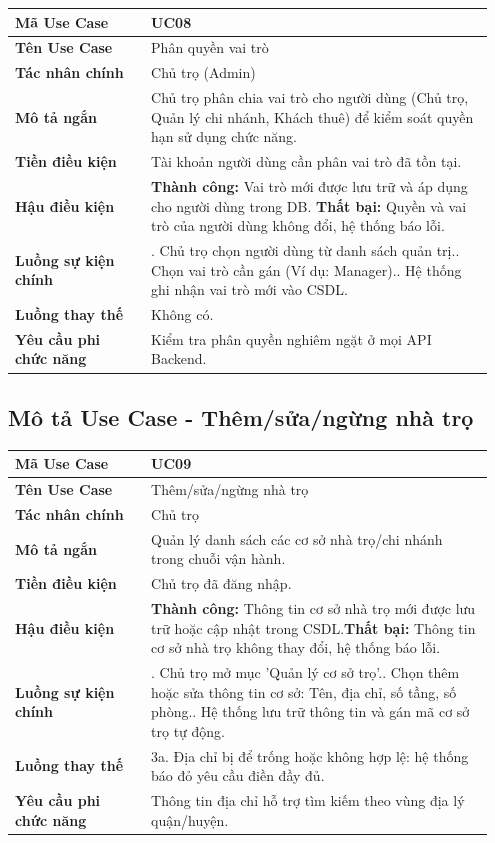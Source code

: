 \documentclass[a4paper,oneside]{report}
\begin{document}
\begin{longtable}[]{@{}>{\RaggedRight\arraybackslash}p{0.27\linewidth}>{\RaggedRight\arraybackslash}p{0.68\linewidth}@{}}
\toprule
\textbf{Mã Use Case} & UC08\tabularnewline
\midrule
\endhead
\textbf{Tên Use Case} & Phân quyền vai trò\tabularnewline
\textbf{Tác nhân chính} & Chủ trọ (Admin)\tabularnewline
\textbf{Mô tả ngắn} & Chủ trọ phân chia vai trò cho người dùng (Chủ trọ,
Quản lý chi nhánh, Khách thuê) để kiểm soát quyền hạn sử dụng chức
năng.\tabularnewline
\textbf{Tiền điều kiện} & Tài khoản người dùng cần phân vai trò đã tồn
tại.\tabularnewline
\textbf{Hậu điều kiện} & \textbf{Thành công:} Vai trò mới được lưu trữ và áp dụng cho người dùng trong DB.\newline
\textbf{Thất bại:} Quyền và vai trò của người dùng không đổi, hệ thống báo lỗi.\tabularnewline
\textbf{Luồng sự kiện chính} & 1. Chủ trọ chọn người
dùng từ danh sách quản trị.\newline 2. Chọn vai trò cần gán (Ví dụ:
Manager).\newline 3. Hệ thống ghi nhận vai trò mới vào
CSDL.\tabularnewline
\textbf{Luồng thay thế} & Không có.\tabularnewline
\textbf{Yêu cầu phi chức năng} & Kiểm tra phân quyền nghiêm ngặt ở mọi
API Backend.\tabularnewline
\bottomrule
\end{longtable}

\subsection{Mô tả Use Case - Thêm/sửa/ngừng nhà trọ}

\begin{longtable}[]{@{}>{\RaggedRight\arraybackslash}p{0.27\linewidth}>{\RaggedRight\arraybackslash}p{0.68\linewidth}@{}}
\toprule
\textbf{Mã Use Case} & UC09\tabularnewline
\midrule
\endhead
\textbf{Tên Use Case} & Thêm/sửa/ngừng nhà trọ\tabularnewline
\textbf{Tác nhân chính} & Chủ trọ\tabularnewline
\textbf{Mô tả ngắn} & Quản lý danh sách các cơ sở nhà trọ/chi nhánh
trong chuỗi vận hành.\tabularnewline
\textbf{Tiền điều kiện} & Chủ trọ đã đăng nhập.\tabularnewline
\textbf{Hậu điều kiện} & \textbf{Thành công:} Thông tin cơ sở nhà trọ mới được lưu trữ hoặc cập nhật trong CSDL.\newline \textbf{Thất bại:} Thông tin cơ sở nhà trọ không thay đổi, hệ thống báo lỗi.\tabularnewline
\textbf{Luồng sự kiện chính} & 1. Chủ trọ mở mục
'Quản lý cơ sở trọ'.\newline 2. Chọn thêm hoặc sửa thông tin cơ sở:
Tên, địa chỉ, số tầng, số phòng.\newline 3. Hệ thống lưu trữ thông
tin và gán mã cơ sở trọ tự động.\tabularnewline
\textbf{Luồng thay thế} & 3a. Địa chỉ bị để trống hoặc không hợp lệ: hệ
thống báo đỏ yêu cầu điền đầy đủ.\tabularnewline
\textbf{Yêu cầu phi chức năng} & Thông tin địa chỉ hỗ trợ tìm kiếm theo
vùng địa lý quận/huyện.\tabularnewline
\bottomrule
\end{longtable}
\end{document}
